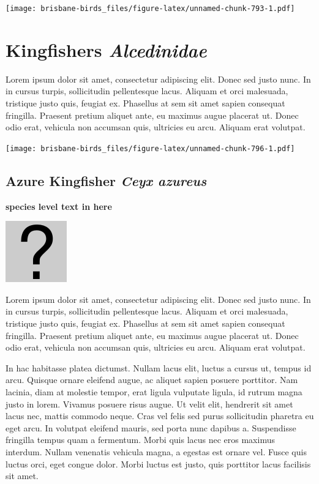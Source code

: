 \documentclass[]{book}
\let\origfigure\figure
\let\endorigfigure\endfigure
\renewenvironment{figure}[1][2] {
  \expandafter\origfigure\expandafter[H]
} {
  \endorigfigure
}
\begin{document}
\begin{figure}
\centering
\texttt{[image: brisbane-birds\_files/figure-latex/unnamed-chunk-793-1.pdf]}
\caption{\label{fig:unnamed-chunk-793}insert figure caption}
\end{figure}

\chapter{\texorpdfstring{Kingfishers
\emph{Alcedinidae}}{Kingfishers Alcedinidae}}\label{kingfishers-alcedinidae}

Lorem ipsum dolor sit amet, consectetur adipiscing elit. Donec sed justo
nunc. In in cursus turpis, sollicitudin pellentesque lacus. Aliquam et
orci malesuada, tristique justo quis, feugiat ex. Phasellus at sem sit
amet sapien consequat fringilla. Praesent pretium aliquet ante, eu
maximus augue placerat ut. Donec odio erat, vehicula non accumsan quis,
ultricies eu arcu. Aliquam erat volutpat.

\texttt{[image: brisbane-birds\_files/figure-latex/unnamed-chunk-796-1.pdf]}

\section{\texorpdfstring{Azure Kingfisher \emph{Ceyx
azureus}}{Azure Kingfisher Ceyx azureus}}\label{azure-kingfisher-ceyx-azureus}

\textbf{species level text in here}

\begin{figure}
\centering
\includegraphics{assets/missing.png}
\caption{No image for species}
\end{figure}

Lorem ipsum dolor sit amet, consectetur adipiscing elit. Donec sed justo
nunc. In in cursus turpis, sollicitudin pellentesque lacus. Aliquam et
orci malesuada, tristique justo quis, feugiat ex. Phasellus at sem sit
amet sapien consequat fringilla. Praesent pretium aliquet ante, eu
maximus augue placerat ut. Donec odio erat, vehicula non accumsan quis,
ultricies eu arcu. Aliquam erat volutpat.

In hac habitasse platea dictumst. Nullam lacus elit, luctus a cursus ut,
tempus id arcu. Quisque ornare eleifend augue, ac aliquet sapien posuere
porttitor. Nam lacinia, diam at molestie tempor, erat ligula vulputate
ligula, id rutrum magna justo in lorem. Vivamus posuere risus augue. Ut
velit elit, hendrerit sit amet lacus nec, mattis commodo neque. Cras vel
felis sed purus sollicitudin pharetra eu eget arcu. In volutpat eleifend
mauris, sed porta nunc dapibus a. Suspendisse fringilla tempus quam a
fermentum. Morbi quis lacus nec eros maximus interdum. Nullam venenatis
vehicula magna, a egestas est ornare vel. Fusce quis luctus orci, eget
congue dolor. Morbi luctus est justo, quis porttitor lacus facilisis sit
amet.
\end{document}
